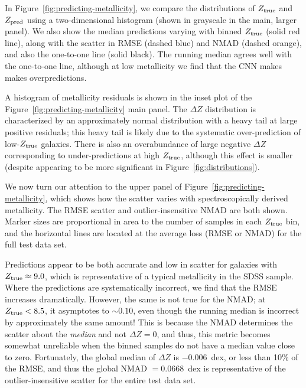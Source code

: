 \documentclass[fleqn,usenatbib]{mnras}
\begin{document}
In Figure~\ref{fig:predicting-metallicity}, we compare the distributions of $Z_{\rm true}$ and $Z_{\rm pred}$ using a two-dimensional histogram (shown in grayscale in the main, larger panel). We also show the median predictions varying with binned $Z_{\rm true}$ (solid red line), along with the scatter in RMSE (dashed blue) and NMAD (dashed orange), and also the one-to-one line (solid black). The running median agrees well with the one-to-one line, although at low metallicity we find that the CNN makes makes overpredictions.

A histogram of metallicity residuals is shown in the inset plot of the Figure~\ref{fig:predicting-metallicity} main panel. The $\Delta Z$ distribution is characterized by an approximately normal distribution with a heavy tail at large positive residuals; this heavy tail is likely due to the systematic over-prediction of low-$Z_{\rm true}$ galaxies.
There is also an overabundance of large negative $\Delta Z$ corresponding to under-predictions at high $Z_{\rm true}$, although this effect is smaller (despite appearing to be more significant in Figure~\ref{fig:distributions}).

We now turn our attention to the upper panel of Figure~\ref{fig:predicting-metallicity}, which shows how the scatter varies with spectroscopically derived metallicity. The RMSE scatter and outlier-insensitive NMAD are both shown. Marker sizes are proportional in area to the number of samples in each $Z_{\rm true}$ bin, and the horizontal lines are located at the average loss (RMSE or NMAD) for the full test data set.

Predictions appear to be both accurate and low in scatter for galaxies with $Z_{\rm true} \approx 9.0$, which is representative of a typical metallicity in the SDSS sample. Where the predictions are systematically incorrect, we find that the RMSE increases dramatically. However, the same is not true for the NMAD; at $Z_{\rm true} < 8.5$, it asymptotes to $\sim 0.10$, even though the running median is incorrect by approximately the same amount! This is because the NMAD determines the scatter about the \textit{median} and not $\Delta Z = 0$, and thus, this metric becomes somewhat unreliable when the binned samples do not have a median value close to zero. Fortunately, the global median of $\Delta Z$ is $-0.006$~dex, or less than 10\% of the RMSE, and thus the global NMAD $= 0.0668$~dex is representative of the outlier-insensitive scatter for the entire test data set.
\end{document}

